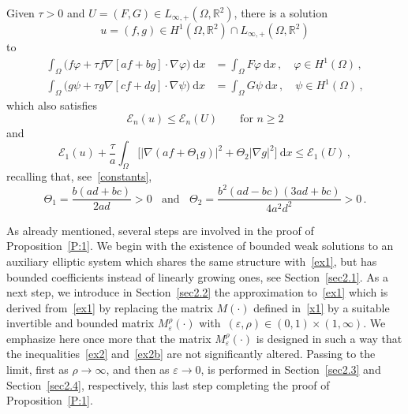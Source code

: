\documentclass[AHL,Unicode,longabstracts,published]{cedram}
\newcommand{\bbR}{\mathbb{R}}
\newcommand{\clE}{\mathcal{E}}
\newcommand{\rmd}{\mathrm{d}}
\newcommand{\clE}{\mathcal{E}}
\begin{document}
\begin{prop}\label{P:1}
Given $\tau>0$ and $U=(F,G)\in L_{\infty,+}(\Omega,\bbR^2)$, there is a solution
\begin{equation*}
u=(f,g) \in H^1\left(\Omega,\bbR^2\right)\cap L_{\infty,+}\left(\Omega,\bbR^2\right)
\end{equation*}
to
\begin{subequations}\label{ex1}
\begin{align}
\int_\Omega \big(f \varphi + \tau f \nabla\left[a f + b g \right] \cdot\nabla\varphi \big)\ \rmd x & = \int_\Omega F \varphi\ \rmd x\,, \quad \varphi\in H^1(\Omega)\,, \label{ex1a}
\\
\int_\Omega \big(g \psi + \tau g \nabla\left[c f +d g \right]\cdot \nabla\psi \big)\ \rmd x & = \int_\Omega G \psi\ \rmd x\,, \quad \psi\in H^1(\Omega)\,, \label{ex1b}
\end{align}
\end{subequations}
which also satisfies
\begin{equation}\label{ex2}
\clE_n(u) \le \clE_n(U)\qquad\text{for $n\ge 2$}
\end{equation}
and
\begin{equation}\label{ex2b}
\clE_1(u) + \frac{\tau}{a} \int_\Omega \big[|\nabla (af+\Theta_1 g)|^2 + \Theta_2|\nabla g|^2 \big]\ \rmd x \le \clE_1(U) \,, 
\end{equation}
recalling that, see~\eqref{constants},
\begin{equation*}
\Theta_1 = \frac{b(ad+bc)}{2ad}>0 \;\;\text{ and }\;\; \Theta_2 = \frac{b^2(ad-bc)(3ad+bc)}{4a^2 d^2}>0\,.
\end{equation*}
\end{prop}


As already mentioned, several steps are involved in the proof of Proposition~\ref{P:1}. We begin with the existence of bounded weak solutions to an auxiliary elliptic system which shares the same structure with~\eqref{ex1}, but has bounded coefficients instead of linearly growing ones, see Section~\ref{sec2.1}. As a next step, we introduce in Section~\ref{sec2.2} the approximation to~\eqref{ex1} which is derived from~\eqref{ex1} by replacing the matrix $M(\cdot)$ defined in~\eqref{x1} by a suitable invertible and bounded matrix $M_\varepsilon^\rho(\cdot)$ with~$(\varepsilon,\rho)\in (0,1)\times (1,\infty)$. We emphasize here once more that the matrix $M_\varepsilon^\rho(\cdot)$ is designed in such a way that the inequalities~\eqref{ex2} and~\eqref{ex2b} are not significantly altered. Passing to the limit, first as $\rho\to\infty$, and then as $\varepsilon\to 0$, is performed in Section~\ref{sec2.3} and Section~\ref{sec2.4}, respectively, this last step completing the proof of Proposition~\ref{P:1}.
\end{document}
